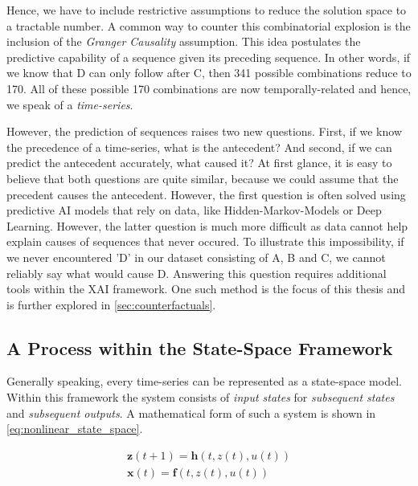 \documentclass[12pt,a4paper]{report}
\begin{document}
Hence, we have to include restrictive assumptions to reduce the solution space to a tractable number. A common way to counter this combinatorial explosion is the inclusion of the \emph{Granger Causality} assumption. This idea postulates the predictive capability of a sequence given its preceding sequence. In other words, if we know that D can only follow after C, then 341 possible combinations reduce to 170. All of these possible 170 combinations are now temporally-related and hence, we speak of a \emph{time-series}. 

However, the prediction of sequences raises two new questions. First, if we know the precedence of a time-series, what is the antecedent? And second, if we can predict the antecedent accurately, what caused it?
At first glance, it is easy to believe that both questions are quite similar, because we could assume that the precedent causes the antecedent. However, 
the first question is often solved using predictive AI models that rely on data, like Hidden-Markov-Models or Deep Learning. However, the latter question is much more difficult as data cannot help explain causes of sequences that never occured. To illustrate this impossibility, if we never encountered 'D' in our dataset consisting of A, B and C, we cannot reliably say what would cause D. Answering this question requires additional tools within the \gls{XAI} framework. One such method is the focus of this thesis and is further explored in \autoref{sec:counterfactuals}.   

\subsection{A Process within the State-Space Framework}
Generally speaking, every time-series can be represented as a state-space model\autocite{kalman_NewApproachLinear_1960a}. Within this framework the system consists of \emph{input states} for \emph{subsequent states} and \emph{subsequent outputs}. A mathematical form of such a system is shown in \autoref{eq:nonlinear_state_space}. 

\begin{equation}
    \label{eq:nonlinear_state_space}
    \begin{array}{l}
        \mathbf{z}(t+1)=\mathbf{h}(t, z(t), u(t)) \\
        \mathbf{x}(t)=\mathbf{f}(t, z(t), u(t))
    \end{array}
\end{equation}
\end{document}

